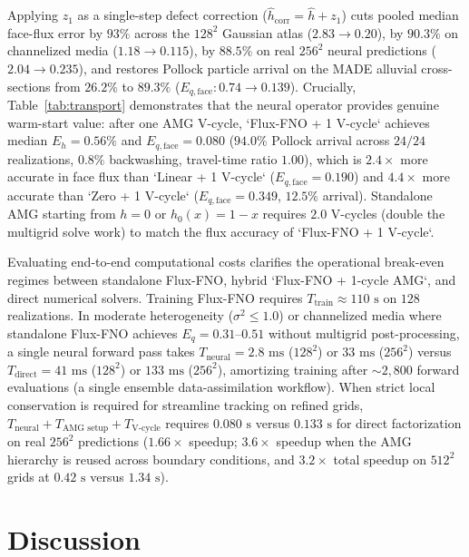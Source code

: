 \documentclass[preprint,12pt,authoryear]{elsarticle}
\begin{document}
Applying $z_1$ as a single-step defect correction ($\hat{h}_{\text{corr}} = \hat{h} + z_1$) cuts pooled median face-flux error by $93\%$ across the $128^2$ Gaussian atlas ($2.83 \to 0.20$), by $90.3\%$ on channelized media ($1.18 \to 0.115$), by $88.5\%$ on real $256^2$ neural predictions ($2.04 \to 0.235$), and restores Pollock particle arrival on the MADE alluvial cross-sections from $26.2\%$ to $89.3\%$ ($E_{q,\text{face}}: 0.74 \to 0.139$). Crucially, Table~\ref{tab:transport} demonstrates that the neural operator provides genuine warm-start value: after one AMG V-cycle, `Flux-FNO + 1 V-cycle` achieves median $E_h = 0.56\%$ and $E_{q,\text{face}} = 0.080$ ($94.0\%$ Pollock arrival across $24/24$ realizations, $0.8\%$ backwashing, travel-time ratio $1.00$), which is $2.4\times$ more accurate in face flux than `Linear + 1 V-cycle` ($E_{q,\text{face}} = 0.190$) and $4.4\times$ more accurate than `Zero + 1 V-cycle` ($E_{q,\text{face}} = 0.349$, $12.5\%$ arrival). Standalone AMG starting from $h = 0$ or $h_0(x) = 1 - x$ requires $2.0$ V-cycles (double the multigrid solve work) to match the flux accuracy of `Flux-FNO + 1 V-cycle`.

Evaluating end-to-end computational costs clarifies the operational break-even regimes between standalone Flux-FNO, hybrid `Flux-FNO + 1-cycle AMG`, and direct numerical solvers. Training Flux-FNO requires $T_{\text{train}} \approx 110\text{ s}$ on $128$ realizations. In moderate heterogeneity ($\sigma^2 \le 1.0$) or channelized media where standalone Flux-FNO achieves $E_q = 0.31$--$0.51$ without multigrid post-processing, a single neural forward pass takes $T_{\text{neural}} = 2.8\text{ ms}$ ($128^2$) or $33\text{ ms}$ ($256^2$) versus $T_{\text{direct}} = 41\text{ ms}$ ($128^2$) or $133\text{ ms}$ ($256^2$), amortizing training after $\sim 2{,}800$ forward evaluations (a single ensemble data-assimilation workflow). When strict local conservation is required for streamline tracking on refined grids, $T_{\text{neural}} + T_{\text{AMG setup}} + T_{\text{V-cycle}}$ requires $0.080\text{ s}$ versus $0.133\text{ s}$ for direct factorization on real $256^2$ predictions ($1.66\times$ speedup; $3.6\times$ speedup when the AMG hierarchy is reused across boundary conditions, and $3.2\times$ total speedup on $512^2$ grids at $0.42\text{ s}$ versus $1.34\text{ s}$).

\section{Discussion}
\label{sec:discussion}
\end{document}
